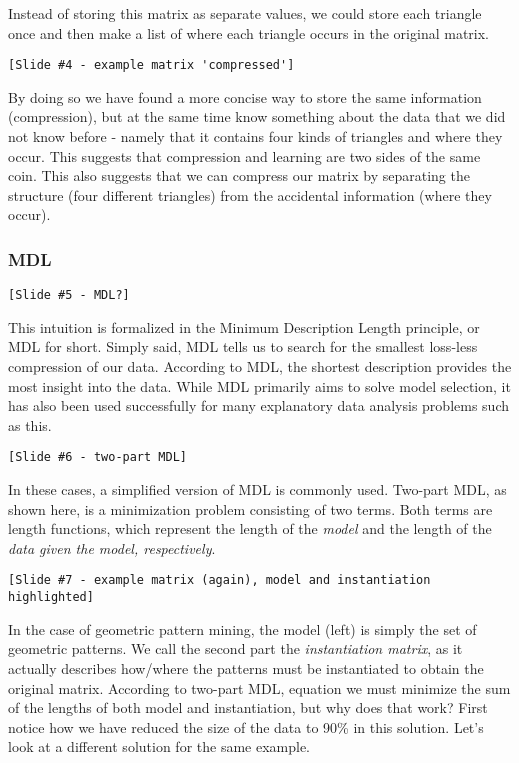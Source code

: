 \documentclass[10pt,a4paper,oneside]{article}
\begin{document}
Instead of storing this matrix as separate values, we could store each triangle once and then make a list of where each triangle occurs in the original matrix. 

\begin{verbatim}
[Slide #4 - example matrix 'compressed']
\end{verbatim}

By doing so we have found a more concise way to store the same information (compression), but at the same time know something about the data that we did not know before - namely that it contains four kinds of triangles and where they occur. This suggests that compression and learning are two sides of the same coin. This also suggests that we can compress our matrix by separating the structure (four different triangles) from the accidental information (where they occur).

\subsubsection{MDL}

\begin{verbatim}
[Slide #5 - MDL?]
\end{verbatim}

This intuition is formalized in the Minimum Description Length principle, or MDL for short. Simply said, MDL tells us to search for the smallest loss-less compression of our data. According to MDL, the shortest description provides the most insight into the data. While MDL primarily aims to solve model selection, it has also been used successfully for many explanatory data analysis problems such as this.

\begin{verbatim}
[Slide #6 - two-part MDL]
\end{verbatim}

In these cases, a simplified version of MDL is commonly used. Two-part MDL, as shown here, is a minimization problem consisting of two terms. Both terms are length functions, which represent the length of the \emph{model} and the length of the \emph{data given the model, respectively}. 

\begin{verbatim}
[Slide #7 - example matrix (again), model and instantiation highlighted]
\end{verbatim}

In the case of geometric pattern mining, the model (left) is simply the set of geometric patterns. We call the second part the \emph{instantiation matrix}, as it actually describes how/where the patterns must be instantiated to obtain the original matrix. According to two-part MDL, equation we must minimize the sum of the lengths of both model and instantiation, but why does that work? First notice how we have reduced the size of the data to 90\% in this solution. Let's look at a different solution for the same example.
\end{document}
